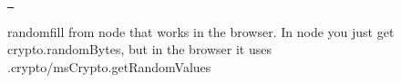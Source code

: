 \href{https://www.npmjs.org/package/randomfill}{\texttt{ }}

randomfill from node that works in the browser. In node you just get crypto.\+random\+Bytes, but in the browser it uses .crypto/ms\+Crypto.\+get\+Random\+Values


\begin{DoxyCode}{0}
\DoxyCodeLine{\});}

\end{DoxyCode}
 